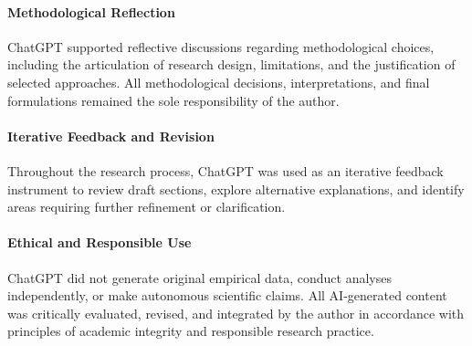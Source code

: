 {\paragraph{Methodological Reflection}
ChatGPT supported reflective discussions regarding methodological choices, including the articulation of research design, limitations, and the justification of selected approaches. All methodological decisions, interpretations, and final formulations remained the sole responsibility of the author.

\paragraph{Iterative Feedback and Revision}
Throughout the research process, ChatGPT was used as an iterative feedback instrument to review draft sections, explore alternative explanations, and identify areas requiring further refinement or clarification.

\paragraph{Ethical and Responsible Use}
ChatGPT did not generate original empirical data, conduct analyses independently, or make autonomous scientific claims. All AI-generated content was critically evaluated, revised, and integrated by the author in accordance with principles of academic integrity and responsible research practice.
}